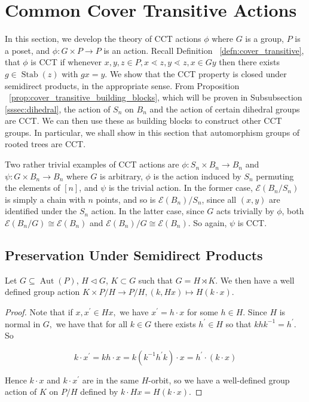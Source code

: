 \documentclass[smallextended]{svjour3}       %
\numberwithin{equation}{section}
\newcommand\ssec{\subsection}
\newcommand\Stab{\operatorname{Stab}}
\newcommand\Aut{\operatorname{Aut}}
\begin{document}

\section{Common Cover Transitive Actions}
\label{sec:cover_transitive}
In this section, we develop the theory of CCT actions $\phi$ where $G$ is a group, $P$ is a poset, and $\phi:G\times P \rightarrow P$ is an action. Recall Definition ~\ref{defn:cover_transitive}, that $\phi$ is CCT if whenever $x,y,z \in P,x\lessdot z,y\lessdot z,x \in Gy$ then there exists $g \in \Stab(z)$ with $gx = y$.  We show that the CCT property is closed under semidirect products, in the appropriate sense. From Proposition ~\ref{prop:cover_transitive_building_blocks}, which will be proven in Subsubsection \ref{sssec:dihedral}, the action of $S_n$ on $B_n$ and the action of certain dihedral groups are CCT. We can then use these as building blocks to construct other CCT groups. In particular, we shall show in this section that automorphism groups of rooted trees are CCT.

\begin{example}
\label{eg:trivial_edgequot}
Two rather trivial examples of CCT actions are $\phi\colon S_n\times B_n \rightarrow B_n$ and $\psi\colon G\times B_n\rightarrow B_n$ where $G$ is arbitrary, $\phi$ is the action induced by $S_n$ permuting the elements of $[n]$, and $\psi$ is the trivial action. In the former case, $\mathcal E(B_n/S_n)$ is simply a chain with $n$ points, and so is $\mathcal E(B_n)/S_n$, since all $(x, y)$ are identified under the $S_n$ action. In the latter case, since $G$ acts trivially by $\phi$, both  $\mathcal E(B_n/G) \cong \mathcal E(B_n)$ and $\mathcal E(B_n)/G \cong \mathcal E(B_n)$. So again, $\psi$ is CCT.
\end{example}

\ssec{Preservation Under Semidirect Products}
\label{ssec:semidirect_product_preservation}

\begin{lemma}
Let $G\subseteq\Aut(P)$, $H\triangleleft G$, $K\subset G$ such that $G = H\rtimes K$. We then have a well defined group action $K \times P/H \rightarrow P/H,(k,Hx) \mapsto H(k \cdot x)$.

\end{lemma}
\begin{proof}

Note that if $x,x^\prime\in Hx,$ we have $x^\prime = h\cdot x$ for some $h\in H$. Since $H$ is normal in $G,$ we have that for all $k \in G$ there exists $h^\prime \in H$ so that $khk^{-1} = h^\prime$. So 

$$k\cdot x^\prime = kh\cdot x = k(k^{-1}h^\prime k)\cdot x = h^\prime\cdot (k\cdot x)$$

Hence $k\cdot x$ and $k\cdot x^\prime$ are in the same $H$-orbit, so we have a well-defined group action of $K$ on $P/H$ defined by $k\cdot Hx = H(k\cdot x)$.
\end{proof}
\end{document}
